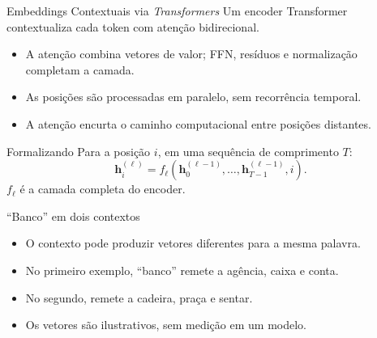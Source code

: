 \documentclass[aspectratio=169, xcolor=dvipsnames]{beamer}
\begin{document}
  \begin{frame}{Embeddings Contextuais via \textit{Transformers}}
    Um encoder Transformer contextualiza cada token com atenção bidirecional.
    \begin{itemize}
      \item A atenção combina vetores de valor; FFN, resíduos e normalização completam a camada.
      \item As posições são processadas em paralelo, sem recorrência temporal.
      \item A atenção encurta o caminho computacional entre posições distantes.
    \end{itemize}
    \begin{block}{Formalizando}
      Para a posição $i$, em uma sequência de comprimento $T$:
      \[
        \mathbf h_i^{(\ell)}=f_\ell\!\left(
          \mathbf h_0^{(\ell-1)},\ldots,\mathbf h_{T-1}^{(\ell-1)},i\right).
      \]
      $f_\ell$ é a camada completa do encoder.
    \end{block}
  \end{frame}

  \begin{frame}{``Banco'' em dois contextos}
    \centering
    \par\medskip
    \begin{itemize}
      \item O contexto pode produzir vetores diferentes para a mesma palavra.
      \item No primeiro exemplo, ``banco'' remete a agência, caixa e conta.
      \item No segundo, remete a cadeira, praça e sentar.
      \item Os vetores são ilustrativos, sem medição em um modelo.
    \end{itemize}
  \end{frame}
\end{document}
